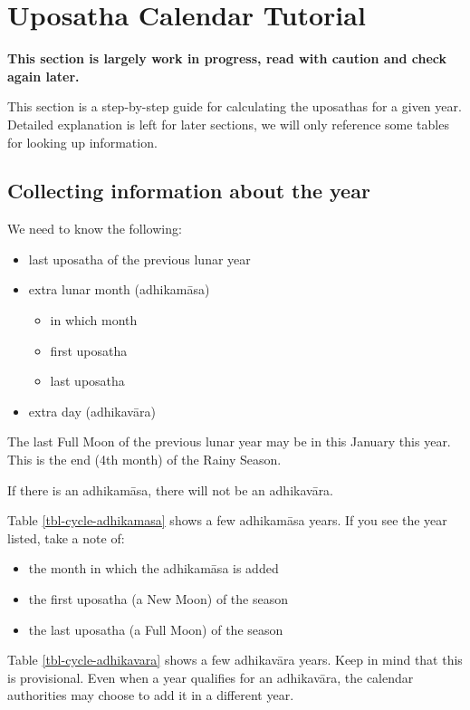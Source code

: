 \documentclass[11pt,oneside]{memoir-article}
\begin{document}
\clearpage

\chapter{Uposatha Calendar Tutorial}
\label{sec-1}

\textbf{This section is largely work in progress, read with caution and check again later.}

This section is a step-by-step guide for calculating the uposathas for a given
year. Detailed explanation is left for later sections, we will only reference
some tables for looking up information.

\section{Collecting information about the year}
\label{sec-1-1}

We need to know the following:

\begin{itemize}
\item last uposatha of the previous lunar year
\item extra lunar month (adhikamāsa)
\begin{itemize}
\item in which month
\item first uposatha
\item last uposatha
\end{itemize}
\item extra day (adhikavāra)
\end{itemize}

The last Full Moon of the previous lunar year may be in this January this year.
This is the end (4th month) of the Rainy Season.

If there is an adhikamāsa, there will not be an adhikavāra.

Table \ref{tbl-cycle-adhikamasa} shows a few adhikamāsa years. If you see the
year listed, take a note of:

\begin{itemize}
\item the month in which the adhikamāsa is added
\item the first uposatha (a New Moon) of the season
\item the last uposatha (a Full Moon) of the season
\end{itemize}

Table \ref{tbl-cycle-adhikavara} shows a few adhikavāra years. Keep in mind that
this is provisional. Even when a year qualifies for an adhikavāra, the calendar
authorities may choose to add it in a different year.
\end{document}
